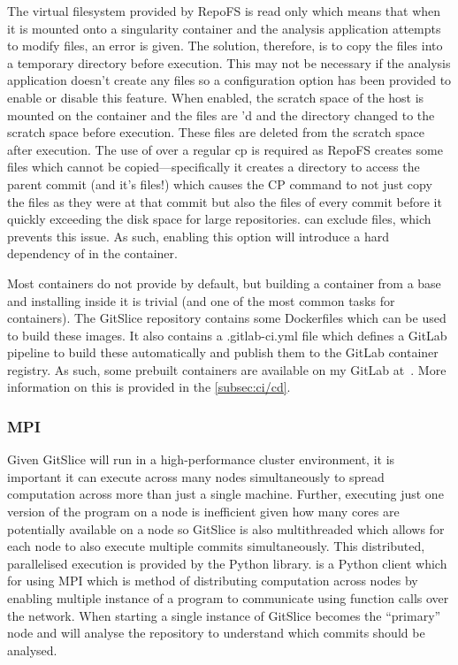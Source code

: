 \documentclass[11pt]{article}
\begin{document}
    The virtual filesystem provided by RepoFS is read only which means that when it is mounted onto a singularity container and the analysis application attempts to modify files, an error is given.
    The solution, therefore, is to copy the files into a temporary directory before execution.
    This may not be necessary if the analysis application doesn't create any files so a configuration option has been provided to enable or disable this feature.
    When enabled, the scratch space of the host is mounted on the container and the files are 'd and the directory changed to the scratch space before execution.
    These files are deleted from the scratch space after execution.
    The use of  over a regular cp is required as RepoFS creates some files which cannot be copied---specifically it creates a directory to access the parent commit (and it's files!) which causes the CP command to not just copy the files as they were at that commit but also the files of every commit before it quickly exceeding the disk space for large repositories.
     can exclude files, which prevents this issue.
    As such, enabling this option will introduce a hard dependency of  in the container.

    Most containers do not provide  by default, but building a container from a base and installing  inside it is trivial (and one of the most common tasks for containers).
    The GitSlice repository contains some Dockerfiles which can be used to build these images.
    It also contains a .gitlab-ci.yml file which defines a GitLab pipeline to build these automatically and publish them to the GitLab container registry.
    As such, some prebuilt containers are available on my GitLab at~\cite{container_registry}.
    More information on this is provided in the \autoref{subsec:ci/cd}.

    \subsubsection{MPI}
    \label{subsubsec:mpi}

    Given GitSlice will run in a high-performance cluster environment, it is important it can execute across many nodes simultaneously to spread computation across more than just a single machine.
    Further, executing just one version of the program on a node is inefficient given how many cores are potentially available on a node so GitSlice is also multithreaded which allows for each node to also execute multiple commits simultaneously.
    This distributed, parallelised execution is provided by the  Python library.
     is a Python client which for using MPI which is method of distributing computation across nodes by enabling multiple instance of a program to communicate using function calls over the network.
    When starting a single instance of GitSlice becomes the ``primary'' node and will analyse the repository to understand which commits should be analysed.
\end{document}
